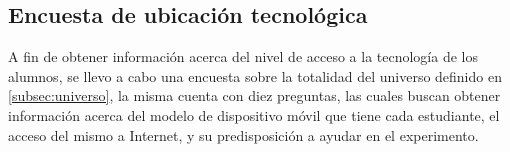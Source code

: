 \subsection{Encuesta de ubicación tecnológica}

\label{subsec:ubicacion}

A fin de obtener información acerca del nivel de acceso a la tecnología de los
alumnos, se llevo a cabo una encuesta sobre la totalidad del universo definido
en \ref{subsec:universo}, la misma cuenta con diez preguntas, las cuales buscan
obtener información acerca del modelo de dispositivo móvil que tiene cada
estudiante, el acceso del mismo a Internet, y su predisposición a ayudar en el
experimento.

